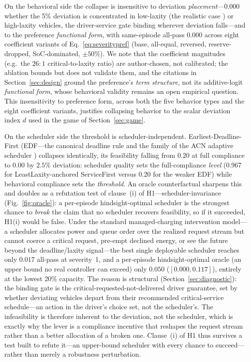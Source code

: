 \documentclass[12pt]{article}
\newcommand{\figref}[1]{Fig.~\ref{#1}}
\begin{document}
On the behavioral side the collapse is insensitive to deviation \emph{placement}---0.000 whether the 5\% deviation is concentrated in low-laxity (the realistic case \cite{alexeenko2023pilot}) or high-laxity vehicles, the driver-service gate binding wherever deviation falls---and to the preference \emph{functional form}, with same-episode all-pass 0.000 across eight coefficient variants of Eq.~\eqref{eq:severitypref} (base, all-equal, reversed, reserve-dropped, SoC-dominated, $\pm50\%$). We note that the coefficient magnitudes (e.g.\ the $26{:}1$ critical-to-laxity ratio) are author-chosen, not calibrated; the ablation bounds but does not validate them, and the citations in Section~\ref{sec:design} ground the preference's \emph{term structure}, not its additive-logit \emph{functional form}, whose behavioral validity remains an open empirical question. This insensitivity to preference form, across both the five behavior types and the eight coefficient variants, justifies collapsing behavior to the scalar deviation index $d$ used in the game of Section~\ref{sec:game}.

On the scheduler side the threshold is scheduler-independent. Earliest-Deadline-First (EDF---the canonical deadline rule and the family of the ACN adaptive scheduler \cite{lee2021adaptive}) collapses identically, its feasibility falling from $0.20$ at full compliance to $0.00$ by $2.5\%$ deviation: scheduler quality sets the full-compliance \emph{level} (0.967 for LeastLaxity-anchored ServiceFirst versus 0.20 for the weaker EDF) while behavioral compliance sets the \emph{threshold}. An oracle counterfactual sharpens this and doubles as a refutation test of clause~(i) of H1---scheduler-invariance (\figref{fig:oracle}): a per-episode hindsight-optimal scheduler is the strongest chance to \emph{break} the claim that no scheduler recovers feasibility, so if it succeeded, H1(i) would be false. Under the standard managed-charging intervention model---a scheduler allocates power and queue order over the realized request stream but cannot coerce a critical request, pre-empt declined energy, or see the future beyond the deadline/laxity signal---the best single deployable scheduler reaches only $0.017$ all-pass at severity~1, and a per-episode hindsight-optimal oracle (an upper bound no real controller can exceed) only $0.050$ ($[0.000, 0.117]$), entirely at the lowest 20\% capacity. The reason is structural (Section~\ref{sec:diagnostic}): the binding gate is the critical-requested-not-delivered driver guarantee, set by whether deviating vehicles depart from their recommended critical-service schedule---an action in the driver's choice set, not the scheduler's. The infeasibility is therefore inherent to the deviation, not the scheduler, which is exactly why the lever is a compliance incentive that reshapes the request stream rather than a better allocation of a broken one. Clause~(i) of H1 thus survives a test built to refute it---an upper-bound scheduler with every chance to succeed---rather than merely a robustness perturbation.
\end{document}
